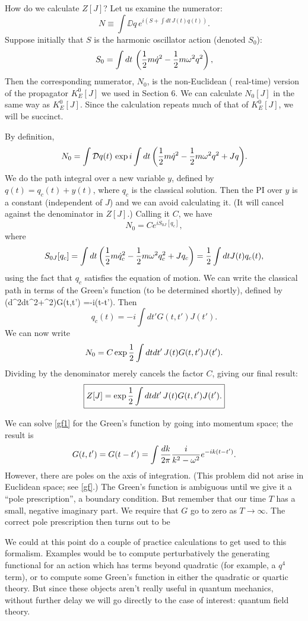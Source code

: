 \documentclass[12pt]{article}
\begin{document}
How do we calculate $Z[J]$? Let us examine the numerator:
\[
N\equiv\int\DD q\,e^{i(S+\int dt\,J(t)q(t))}.
\]
Suppose initially that $S$ is the harmonic oscillator action (denoted
$S_0$):
\[
S_0=\int dt\,\left({\frac 12} m{\dot q}^2-{\frac 12} m{\omega}^2q^2\right),
\]
Then the corresponding numerator, $N_0$, is the non-Euclidean (\ie
real-time) version of the propagator $K_E^0[J]$ we used in Section
6. We can calculate $N_0[J]$ in the same way as $K_E^0[J]$. Since the
calculation repeats much of that of $K_E^0[J]$, we will be succinct.

By definition,
\[
N_0=\int \DD q(t)\,\exp{i\int dt
\left(\half m{\dot q}^2-\half m\om^2q^2+Jq\right)}.
\]
We do the path integral over a new variable $y$, defined by
$q(t)=q_c(t)+y(t)$, where $q_c$ is the classical solution. Then the PI
over $y$ is a constant (independent of $J$)
and we can avoid calculating it. (It will
cancel against the denominator in $Z[J]$.) Calling it $C$, we have
\[
N_0=C e^{iS_{0J}[q_c]},
\]
where
\[
S_{0J}[q_c]=\int dt
\left({\frac 12} m{\dot q_c}^2-{\frac 12} m{\omega}^2q_c^2+Jq_c\right)
={\frac 12}\int dt J(t)q_c(t),
\]
using the fact that $q_c$ satisfies the equation of
motion. We can write the classical path in terms of the Green's
function (to be determined shortly), defined by
\beq
\left({d^2\over dt^2}+\om^2\right)G(t,t')
=-i\delta(t-t').
\label{gf1}
\eeq
Then
\[
q_c(t)=-i\int dt'G(t,t')J(t').
\]
We can now write
\[
N_0=C \exp{{\frac 12}\int dt dt'\,J(t)G(t,t')J(t')}.
\]
Dividing by the denominator merely cancels the factor $C$, giving our
final result:
\[
\fbox{$\displaystyle
Z[J]=\exp{{\frac 12}\int dt dt'\,J(t)G(t,t')J(t')}.
$}
\]

We can solve \eqref{gf1} for the Green's function by going into
momentum space; the result is
\[
G(t,t')=G(t-t')=\int{dk\over2\pi}{i\over k^2-{\omega}^2}
e^{-ik(t-t')}.
\]
However, there are poles on the axis of integration. (This problem did
not arise in Euclidean space; see \eqref{gf}.) 
The Green's function is ambiguous until
we give it a ``pole prescription'', \ie a boundary condition. But
remember that our time $T$ has a small, negative imaginary part. We
require that $G$ go to zero as $T\to\infty$. The correct pole
prescription then turns out to be
\beq
{}
\label{new1}
\eeq

We could at this point do a couple of practice calculations to get
used to this formalism. Examples would be to compute perturbatively
the generating functional for an action which has terms beyond
quadratic (for example, a $q^4$ term), or to compute some Green's
function in either the quadratic or quartic theory. But since these
objects aren't really useful in quantum mechanics, without further
delay we will go directly
to the case of interest: quantum field theory.
\end{document}
